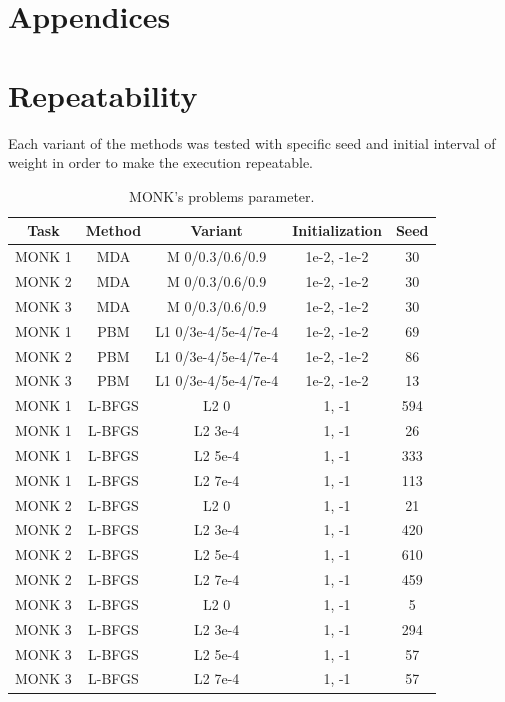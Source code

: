 \appendix
{}
\section*{Appendices}
\section{Repeatability}
Each variant of the methods was tested with specific seed and initial interval of weight in order to make the execution repeatable.

\begin{table}[H]
	\centering
	\begin{tabular}{|c|c|c|c|c|}
		\hline
		\textbf{Task} &	\textbf{Method} &\textbf{ Variant} & \textbf{Initialization} &\textbf{Seed} \\ \hline
		MONK 1        &    MDA & M  0/0.3/0.6/0.9 & 1e-2, -1e-2 & 30  \\ \hline
		MONK 2        &    MDA & M  0/0.3/0.6/0.9 & 1e-2, -1e-2 & 30  \\ \hline
		MONK 3        &    MDA & M  0/0.3/0.6/0.9 & 1e-2, -1e-2 & 30  \\ \hline			
		MONK 1        &    PBM & L1  0/3e-4/5e-4/7e-4 & 1e-2, -1e-2 & 69  \\ \hline
		MONK 2        &    PBM & L1  0/3e-4/5e-4/7e-4 & 1e-2, -1e-2 & 86  \\ \hline
		MONK 3        &    PBM & L1  0/3e-4/5e-4/7e-4 & 1e-2, -1e-2 & 13  \\ \hline			
		MONK 1        &    L-BFGS & L2  0 & 1, -1 & 594  \\ \hline
		MONK 1        &    L-BFGS & L2  3e-4 & 1, -1 & 26  \\ \hline
		MONK 1        &    L-BFGS & L2  5e-4 & 1, -1 & 333  \\ \hline
		MONK 1        &    L-BFGS & L2  7e-4 & 1, -1 & 113  \\ \hline
		MONK 2        &    L-BFGS & L2  0 & 1, -1 & 21  \\ \hline
		MONK 2        &    L-BFGS & L2  3e-4 & 1, -1 & 420  \\ \hline
		MONK 2        &    L-BFGS & L2  5e-4 & 1, -1 & 610  \\ \hline
		MONK 2        &    L-BFGS & L2  7e-4 & 1, -1 & 459  \\ \hline
		MONK 3        &    L-BFGS & L2  0 & 1, -1 & 5  \\ \hline
		MONK 3        &    L-BFGS & L2  3e-4 & 1, -1 & 294  \\ \hline
		MONK 3        &    L-BFGS & L2  5e-4 & 1, -1 & 57  \\ \hline
		MONK 3        &    L-BFGS & L2  7e-4 & 1, -1 & 57  \\ \hline
	\end{tabular}
	\caption{MONK's problems parameter.}
	\label{tab:dati}
\end{table}
